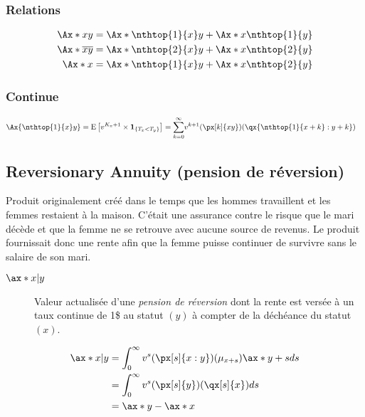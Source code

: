 \documentclass[10pt, french]{article}
\begin{document}
\begin{multicols*}{2}
\subsubsection*{Relations}
\begin{align*}
	\Ax*{xy}
	&=	\Ax*{\nthtop{1}{x}y} + \Ax*{x\nthtop{1}{y}}	\\
	\Ax*{\overline{xy}}
	&=	\Ax*{\nthtop{2}{x}y} + \Ax*{x\nthtop{2}{y}}	\\
	\Ax*{x}
	&=	\Ax*{\nthtop{1}{x}y} + \Ax*{x\nthtop{2}{y}}	\\
\end{align*}


\subsubsection*{Continue}
	\begin{align*}
	\Ax{\nthtop{1}{x}y}
	&=	\esp{v^{K_{x} + 1} \times \bm{1}_{\{T_{x} < T_{y}\}}}
	=	\sumz{\infty}{k = 0} v^{k + 1} (\px[k]{xy})(\qx{\nthtop{1}{x + k} : y + k})
	\end{align*}

\columnbreak

\subsection*{Reversionary Annuity (pension de réversion)}
\begin{rappel_enhanced}[Historique]
Produit originalement créé dans le temps que les hommes travaillent et les femmes restaient à la maison. C'était une assurance contre le risque que le mari décède et que la femme ne se retrouve avec aucune source de revenus. Le produit fournissait donc une rente afin que la femme puisse continuer de survivre sans le salaire de son mari.
\end{rappel_enhanced}

\begin{distributions}[Notation]
\begin{description}
	\item[$\ax*{x | y}$]	Valeur actualisée d'une \textit{pension de réversion} dont la rente est versée à un taux continue de 1\$ au statut $(y)$ à compter de la déchéance du statut $(x)$.
\end{description}
\end{distributions}

\begin{align*}
	\ax*{x | y}
	&=	\int_{0}^{\infty} v^{s} (\px[s]{x:y})(\mu_{x + s}) \ax*{y + s} ds	\\
	&=	\int_{0}^{\infty} v^{s} (\px[s]{y})(\qx[s]{x}) ds	\\
	&=	\ax*{y}	-	\ax*{x}
\end{align*}


\end{multicols*}
\end{document}
